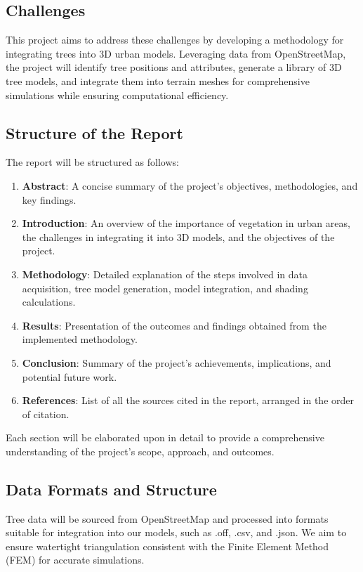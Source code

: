 \documentclass[12pt]{article}
\begin{document}
\subsection{Challenges}
This project aims to address these challenges by developing a methodology for 
integrating trees into 3D urban models. Leveraging data from OpenStreetMap, the 
project will identify tree positions and attributes, generate a library of 3D tree 
models, and integrate them into terrain meshes for comprehensive simulations while
ensuring computational efficiency.

\subsection{Structure of the Report}

The report will be structured as follows:

\begin{enumerate}
    \item \textbf{Abstract}: A concise summary of the project's objectives, methodologies, 
    and key findings.
    
    \item \textbf{Introduction}: An overview of the importance of vegetation in urban areas, 
    the challenges in integrating it into 3D models, and the objectives of the project.
    
    \item \textbf{Methodology}: Detailed explanation of the steps involved in data acquisition, 
    tree model generation, model integration, and shading calculations.
    
    \item \textbf{Results}: Presentation of the outcomes and findings obtained from the 
    implemented methodology.
    
    \item \textbf{Conclusion}: Summary of the project's achievements, implications, and 
    potential future work.
    
    \item \textbf{References}: List of all the sources cited in the report, arranged in 
    the order of citation.
\end{enumerate}

Each section will be elaborated upon in detail to provide a comprehensive understanding 
of the project's scope, approach, and outcomes.


\subsection{Data Formats and Structure}
Tree data will be sourced from OpenStreetMap and processed into formats suitable for 
integration into our models, such as .off, .csv, and .json. We aim to ensure watertight 
triangulation consistent with the Finite Element Method (FEM) for accurate simulations.  
\end{document}
